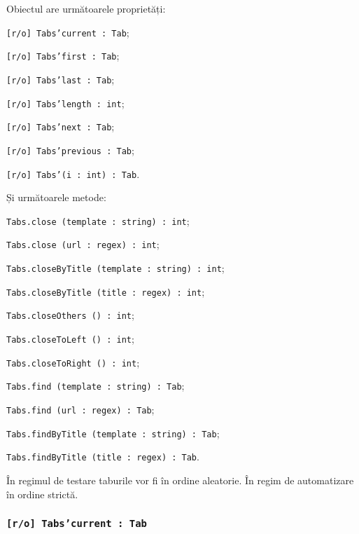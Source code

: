 Obiectul \tabs{} are următoarele proprietăți:
\begin{icItems}
	\item \texttt{[r/o] Tabs'current : Tab};
	\item \texttt{[r/o] Tabs'first : Tab};
	\item \texttt{[r/o] Tabs'last : Tab};
	\item \texttt{[r/o] Tabs'length : int};
	\item \texttt{[r/o] Tabs'next : Tab};
	\item \texttt{[r/o] Tabs'previous : Tab};
	\item \texttt{[r/o] Tabs'(i : int) : Tab}.
\end{icItems}

Și următoarele metode:
\begin{icItems}
	\item \texttt{Tabs.close (template : string) : int};
	\item \texttt{Tabs.close (url : regex) : int};
	\item \texttt{Tabs.closeByTitle (template : string) : int};
	\item \texttt{Tabs.closeByTitle (title : regex) : int};
	\item \texttt{Tabs.closeOthers () : int};
	\item \texttt{Tabs.closeToLeft () : int};
	\item \texttt{Tabs.closeToRight () : int};
	\item \texttt{Tabs.find (template : string) : Tab};
	\item \texttt{Tabs.find (url : regex) : Tab};
	\item \texttt{Tabs.findByTitle (template : string) : Tab};
	\item \texttt{Tabs.findByTitle (title : regex) : Tab}.
\end{icItems}

În regimul de testare taburile vor fi în ordine aleatorie. În regim de automatizare în ordine strictă.

\subsubsection{\texttt{[r/o] Tabs'current : Tab}}


